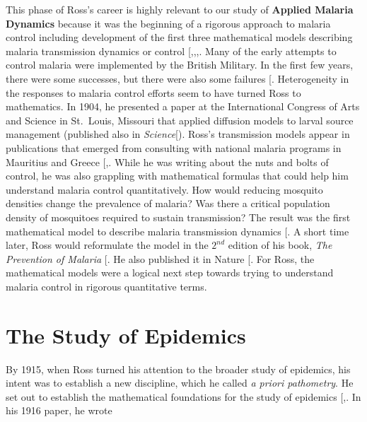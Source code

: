 \documentclass[
]{book}
\begin{document}
This phase of Ross's career is highly relevant to our study of \textbf{Applied Malaria Dynamics} because it was the beginning of a rigorous approach to malaria control including development of the first three mathematical models describing malaria transmission dynamics or control {[},,,\citeproc{ref-RossR1911Nature}{28}{]}.
Many of the early attempts to control malaria were implemented by the British Military. In the first few years, there were some successes, but there were also some failures {[}\citeproc{ref-RossR1907PreventionMalaria}{41}{]}.
Heterogeneity in the responses to malaria control efforts seem to have turned Ross to mathematics.
In 1904, he presented a paper at the International Congress of Arts and Science in St.~Louis, Missouri that applied diffusion models to larval source management (published also in \emph{Science}{[}\citeproc{ref-RossR1905LogicalBasis}{12}{]}).
Ross's transmission models appear in publications that emerged from consulting with national malaria programs in Mauritius and Greece {[},\citeproc{ref-RossR1909}{42}{]}.
While he was writing about the nuts and bolts of control, he was also grappling with mathematical formulas that could help him understand malaria control quantitatively.
How would reducing mosquito densities change the prevalence of malaria?
Was there a critical population density of mosquitoes required to sustain transmission?
The result was the first mathematical model to describe malaria transmission dynamics {[}\citeproc{ref-RossR1908}{13}{]}.
A short time later, Ross would reformulate the model in the \(2^{nd}\) edition of his book, \emph{The Prevention of Malaria} {[}\citeproc{ref-RossR1911Book}{1}{]}.
He also published it in Nature {[}\citeproc{ref-RossR1911Nature}{28}{]}. For Ross, the mathematical models were a logical next step towards trying to understand malaria control in rigorous quantitative terms.

\section{The Study of Epidemics}\label{the-study-of-epidemics}

By 1915, when Ross turned his attention to the broader study of epidemics, his intent was to establish a new discipline, which he called \emph{a priori pathometry}.
He set out to establish the mathematical foundations for the study of epidemics {[},\citeproc{ref-RossR1916ApplicationTheory}{44}{]}.
In his 1916 paper, he wrote
\end{document}
